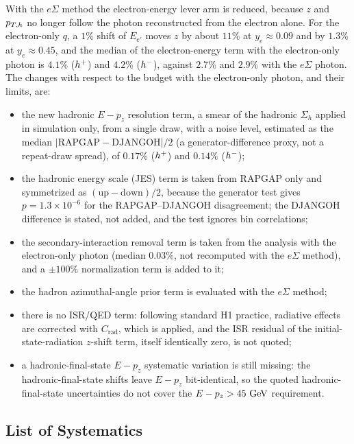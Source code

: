 With the $e\Sigma$ method the electron-energy lever arm is reduced, because
$z$ and $p_{T,h}$ no longer follow the photon reconstructed from the electron alone.
For the electron-only $q$, a $1\%$ shift of $E_{e'}$
moves $z$ by about $11\%$ at $y_e\approx0.09$ and by $1.3\%$ at $y_e\approx0.45$, and the
median of the electron-energy term with the electron-only photon is $4.1\%$ ($h^{+}$) and
$4.2\%$ ($h^{-}$), against $2.7\%$ and $2.9\%$ with the $e\Sigma$ photon.
The changes with respect to the budget with the electron-only photon, and their limits, are:
\begin{itemize}
  \item the new hadronic $E-p_z$ resolution term, a smear of the hadronic $\Sigma_h$ applied in
        simulation only, from a single draw, with a noise level, estimated as the median
        $|\mathrm{RAPGAP}-\mathrm{DJANGOH}|/2$ (a generator-difference proxy, not a
        repeat-draw spread), of $0.17\%$ ($h^{+}$) and $0.14\%$ ($h^{-}$);
  \item the hadronic energy scale (JES) term is taken from RAPGAP only and symmetrized as
        $(\mathrm{up}-\mathrm{down})/2$, because the generator test gives
        $p=1.3\times10^{-6}$ for the RAPGAP--DJANGOH disagreement; the DJANGOH
        difference is stated, not added, and the test ignores bin correlations;
  \item the secondary-interaction removal term is taken from the analysis with the
        electron-only photon (median $0.03\%$, not recomputed with the $e\Sigma$ method), and a $\pm100\%$
        normalization term is added to it;
  \item the hadron azimuthal-angle prior term is evaluated with the $e\Sigma$ method;
  \item there is no ISR/QED term: following standard H1 practice, radiative effects
        are corrected with $C_{\mathrm{rad}}$, which is applied, and the ISR residual
        of the initial-state-radiation $z$-shift term, itself identically zero, is not quoted;
  \item a hadronic-final-state $E-p_z$ systematic variation is still missing: the
        hadronic-final-state shifts leave $E-p_z$ bit-identical, so the quoted
        hadronic-final-state uncertainties do not cover the $E-p_z>45~\text{GeV}$ requirement.
\end{itemize}
\subsection{List of Systematics}
\label{sec:syst:z005-components}

